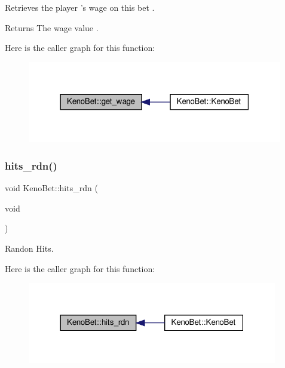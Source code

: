 Retrieves the player ’s wage on this bet . 

\begin{DoxyReturn}{Returns}
The wage value . 
\end{DoxyReturn}
Here is the caller graph for this function\+:
\nopagebreak
\begin{figure}[H]
\begin{center}
\leavevmode
\includegraphics[width=316pt]{classKenoBet_a65f0348e49dd8a2e2dddfcc9a1f05a65_icgraph}
\end{center}
\end{figure}
\mbox{\label{classKenoBet_aa2093fa2b053cf74e95d1e6b54d748f3}} 
\subsubsection{\texorpdfstring{hits\+\_\+rdn()}{hits\_rdn()}}
{\footnotesize\ttfamily void Keno\+Bet\+::hits\+\_\+rdn (\begin{DoxyParamCaption}\item[{void}]{ }\end{DoxyParamCaption})}



Randon Hits. 

Here is the caller graph for this function\+:
\nopagebreak
\begin{figure}[H]
\begin{center}
\leavevmode
\includegraphics[width=309pt]{classKenoBet_aa2093fa2b053cf74e95d1e6b54d748f3_icgraph}
\end{center}
\end{figure}
\mbox{\label{classKenoBet_a5a544a0c1ba5872076e7bfdf8f935368}} 
